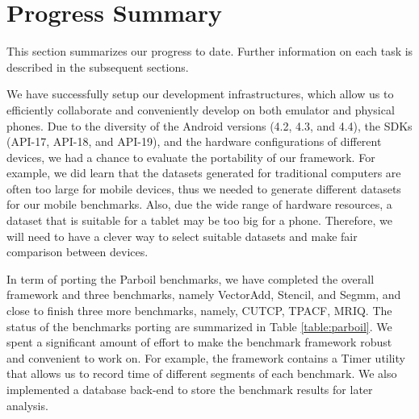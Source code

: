 
\section*{Progress Summary}

This section summarizes our progress to date. Further information on each task
is described in the subsequent sections.

We have successfully setup our development infrastructures, which allow us to
efficiently collaborate and conveniently develop on both emulator and physical
phones.  Due to the diversity of the Android versions (4.2, 4.3, and 4.4), the
SDKs (API-17, API-18, and API-19), and the hardware configurations of different
devices, we had a chance to evaluate the portability of our framework. For
example, we did learn that the datasets generated for traditional computers are
often too large for mobile devices, thus we needed to generate different
datasets for our mobile benchmarks. Also, due the wide range of hardware
resources, a dataset that is suitable for a tablet may be too big for a phone.
Therefore, we will need to have a clever way to select suitable datasets and
make fair comparison between devices.


In term of porting the Parboil benchmarks, we have completed the overall
framework and three benchmarks, namely VectorAdd, Stencil, and Segmm, and close
to finish three more benchmarks, namely, CUTCP, TPACF, MRIQ. The status of the
benchmarks porting are summarized in Table \ref{table:parboil}. We spent a
significant amount of effort to make the benchmark framework robust and
convenient to work on. For example, the framework contains a Timer utility that
allows us to record time of different segments of each benchmark. We also
implemented a database back-end to store the benchmark results for later
analysis.


